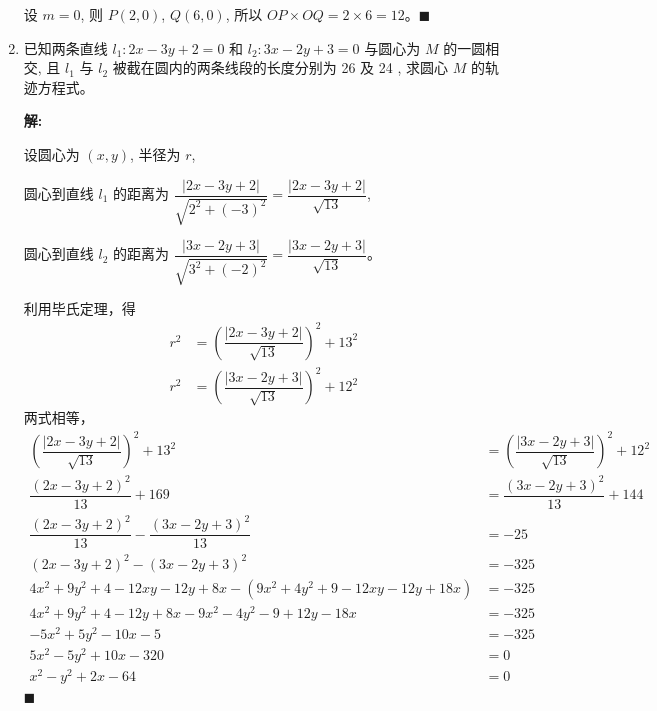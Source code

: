 \documentclass[10pt]{article}
\newcommand{\sol}{\textbf{解:} }
\begin{document}
\begin{enumerate}[leftmargin=*]
        设 $m = 0$, 则 $P(2, 0)$, $Q(6, 0)$, 所以 $OP \times OQ = 2 \times 6 = 12$。\hfill$\blacksquare$

        \newpage
  \item 已知两条直线 $l_{1}: 2 x-3 y+2=0$ 和 $l_{2}: 3 x-2 y+3=0$ 与圆心为 $M$ 的一圆相交, 且 $l_{1}$ 与 $l_{2}$ 被截在圆内的两条线段的长度分别为 26 及 24 , 求圆心 $M$ 的轨迹方程式。

        \sol{}

        设圆心为 $(x, y)$, 半径为 $r$,

        圆心到直线 $l_{1}$ 的距离为 $\dfrac{|2x-3y+2|}{\sqrt{2^{2}+(-3)^{2}}} = \dfrac{|2x-3y+2|}{\sqrt{13}}$,

        圆心到直线 $l_{2}$ 的距离为 $\dfrac{|3x-2y+3|}{\sqrt{3^{2}+(-2)^{2}}} = \dfrac{|3x-2y+3|}{\sqrt{13}}$。

        利用毕氏定理，得
        \begin{align*}
          r^{2} & = \left(\dfrac{|2x-3y+2|}{\sqrt{13}}\right)^{2} + 13^{2} \\
          r^2   & = \left(\dfrac{|3x-2y+3|}{\sqrt{13}}\right)^{2} + 12^{2}
        \end{align*}
        两式相等，
        \begin{align*}
          \left(\dfrac{|2x-3y+2|}{\sqrt{13}}\right)^{2} + 13^{2}                           & = \left(\dfrac{|3x-2y+3|}{\sqrt{13}}\right)^{2} + 12^{2} \\
          \dfrac{(2x-3y+2)^{2}}{13} + 169                                                  & = \dfrac{(3x-2y+3)^{2}}{13} + 144                        \\
          \dfrac{(2x-3y+2)^{2}}{13} - \dfrac{(3x-2y+3)^{2}}{13}                            & = -25                                                    \\
          (2x-3y+2)^{2} - (3x-2y+3)^{2}                                                    & = -325                                                   \\
          4x^{2} + 9y^{2} + 4 - 12xy - 12y + 8x - (9x^{2} + 4y^{2} + 9 - 12xy - 12y + 18x) & = -325                                                   \\
          4x^{2} + 9y^{2} + 4 - 12y + 8x - 9x^{2} - 4y^{2} - 9 + 12y - 18x                 & = -325                                                   \\
          -5x^{2} + 5y^{2} - 10x - 5                                                       & = -325                                                   \\
          5x^{2} - 5y^{2} + 10x - 320                                                      & = 0                                                      \\
          x^{2} - y^{2} + 2x - 64                                                          & = 0
        \end{align*} \hfill$\blacksquare$


\end{enumerate}
\end{document}
